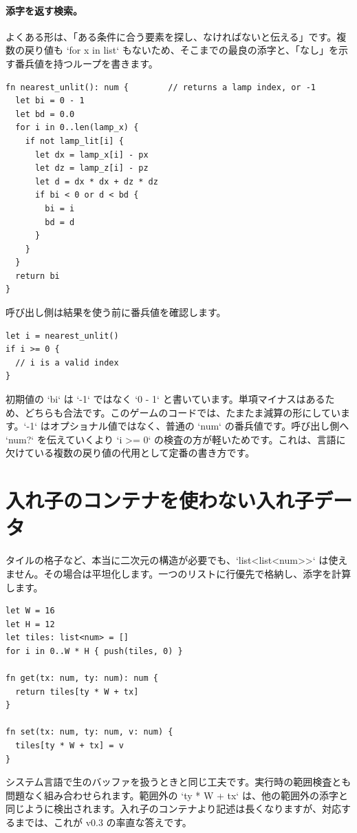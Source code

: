 \paragraph{添字を返す検索。} よくある形は、「ある条件に合う要素を探し、なければないと伝える」です。複数の戻り値も `for x in list` もないため、そこまでの最良の添字と、「なし」を示す番兵値を持つループを書きます。

\begin{lstlisting}[language=wick]
fn nearest_unlit(): num {        // returns a lamp index, or -1
  let bi = 0 - 1
  let bd = 0.0
  for i in 0..len(lamp_x) {
    if not lamp_lit[i] {
      let dx = lamp_x[i] - px
      let dz = lamp_z[i] - pz
      let d = dx * dx + dz * dz
      if bi < 0 or d < bd {
        bi = i
        bd = d
      }
    }
  }
  return bi
}
\end{lstlisting}

\noindent
呼び出し側は結果を使う前に番兵値を確認します。

\begin{lstlisting}[language=wick]
let i = nearest_unlit()
if i >= 0 {
  // i is a valid index
}
\end{lstlisting}

\noindent
初期値の `bi` は `-1` ではなく `0 - 1` と書いています。単項マイナスはあるため、どちらも合法です。このゲームのコードでは、たまたま減算の形にしています。`-1` はオプショナル値ではなく、普通の `num` の番兵値です。呼び出し側へ `num?` を伝えていくより `i >= 0` の検査の方が軽いためです。これは、言語に欠けている複数の戻り値の代用として定番の書き方です。

\section{入れ子のコンテナを使わない入れ子データ}

タイルの格子など、本当に二次元の構造が必要でも、`list<list<num>>` は使えません。その場合は平坦化します。一つのリストに行優先で格納し、添字を計算します。

\begin{lstlisting}[language=wick]
let W = 16
let H = 12
let tiles: list<num> = []
for i in 0..W * H { push(tiles, 0) }

fn get(tx: num, ty: num): num {
  return tiles[ty * W + tx]
}

fn set(tx: num, ty: num, v: num) {
  tiles[ty * W + tx] = v
}
\end{lstlisting}

\noindent
システム言語で生のバッファを扱うときと同じ工夫です。実行時の範囲検査とも問題なく組み合わせられます。範囲外の `ty * W + tx` は、他の範囲外の添字と同じように検出されます。入れ子のコンテナより記述は長くなりますが、対応するまでは、これが v0.3 の率直な答えです。
